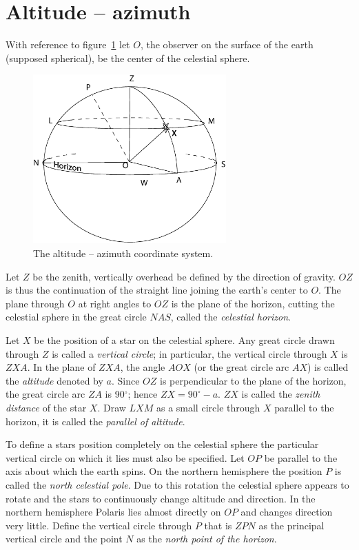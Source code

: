 \section{Altitude -- azimuth}

With reference to figure~\ref{fig:alt-az} let $O$, the observer on
the surface of the earth (supposed spherical), be the center of the
celestial sphere. 

\begin{figure}[h]
\centering
\includegraphics[width=0.66\textwidth]{alt-az.eps}
\caption{The altitude -- azimuth coordinate system.}
\label{fig:alt-az}
\end{figure}

Let $Z$ be the zenith, vertically overhead be defined by the direction
of gravity. $OZ$ is thus the continuation of the straight line joining
the earth's center to $O$. The plane through $O$ at right angles to
$OZ$ is the plane of the horizon, cutting the celestial sphere in the
great circle $NAS$, called the {\it celestial horizon}. 

Let $X$ be the position of a star on the celestial sphere. Any great
circle drawn through $Z$ is called a {\it vertical circle}; in
particular, the vertical circle through $X$ is $ZXA$. In the plane of
$ZXA$, the angle $AOX$ (or the great circle arc $AX$) is called the
{\it altitude} denoted by $a$. Since $OZ$ is perpendicular to the plane of
the horizon, the great circle arc $ZA$ is 90$^\circ$; hence
$ZX=90^\circ-a$. $ZX$ is called the {\it zenith distance} of the star
$X$. Draw $LXM$ as a small circle through $X$ parallel to the
horizon, it is called the {\it parallel of altitude}. 

To define a stars position completely on the celestial sphere the
particular vertical circle on which it lies must also be
specified. Let $OP$ be parallel to the axis about which the earth
spins. On the northern hemisphere the position $P$ is called the {\it
  north celestial pole}. Due to this rotation the celestial sphere
appears to rotate and the stars to continuously change altitude and
direction. In the northern hemisphere Polaris lies almost directly on
$OP$ and changes direction very little. Define the vertical circle
through $P$ that is $ZPN$ as the principal vertical circle and the
point $N$ as the {\it north point of the horizon}. 

